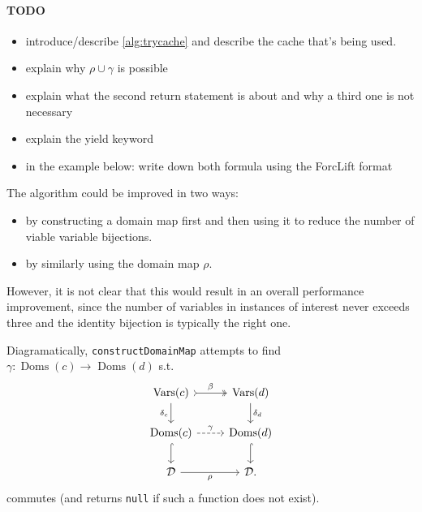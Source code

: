 \documentclass{article}
\theoremstyle{definition}
\theoremstyle{remark}
\DeclareMathOperator{\Doms}{Doms}
\DeclareMathOperator{\Vars}{Vars}
\begin{document}
\paragraph{TODO}
\begin{itemize}
\item introduce/describe \cref{alg:trycache} and describe the cache that's being used.
\item explain why $\rho \cup \gamma$ is possible
\item explain what the second return statement is about and why a third one is not necessary
\item explain the yield keyword
\item in the example below: write down both formula using the ForcLift format
\end{itemize}

The algorithm could be improved in two ways:
\begin{itemize}
\item by constructing a domain map first and then using it to reduce the number of viable variable bijections.
\item by similarly using the domain map $\rho$.
\end{itemize}
However, it is not clear that this would result in an overall performance improvement, since the number of variables in instances of interest never exceeds three and the identity bijection is typically the right one.

Diagramatically, \texttt{constructDomainMap} attempts to find $\gamma\colon \Doms(c) \to \Doms(d)$ s.t.
\begin{equation} \label{eq:commute}
\begin{tikzcd}
  \Vars(c) \ar[r, tail, two heads, "\beta"] \arrow[d, swap, "\delta_c"] & \Vars(d) \ar[d, "\delta_d"] \\
  \Doms(c) \ar[r, dashed, "\gamma"] \ar[d, hookrightarrow] & \Doms(d) \ar[d, hookrightarrow] \\
  \mathcal{D} \ar[r, swap, "\rho"] & \mathcal{D}.
\end{tikzcd}
\end{equation}
commutes (and returns \texttt{null} if such a function does not exist).
\end{document}
